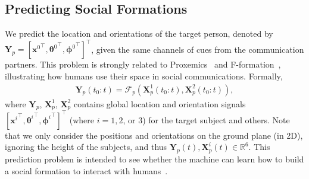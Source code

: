 

\subsection{Predicting Social Formations}
We predict the location and orientations of the target person, denoted by $\mathbf{Y}_p = [{\mathbf{x}^0}^{\top}, {\boldsymbol{\theta}^{0}}^{\top}, {\boldsymbol{\phi}^{0}}^{\top} ]^{\top}$, given the same channels of cues from the communication partners. This problem is strongly related to Proxemics~\cite{Hall66} and F-formation~\cite{kendon90}, illustrating how humans use their space in social communications. Formally, 
\begin{gather}	
 \mathbf{Y}_p (t_0:t) = \mathcal{F}_p \left( \mathbf{X}_p^1(t_0:t), \mathbf{X}_p^2(t_0:t) \right),
 \label{eq:pred_formation}
\end{gather}
where $\mathbf{Y}_p$, $\mathbf{X}_p^1$, $\mathbf{X}_p^2$ contains global location and orientation signals $[{\mathbf{x}^i}^{\top}, {\boldsymbol{\theta}^{i}}^{\top}, {\boldsymbol{\phi}^{i}}^{\top} ]^{\top}$ (where $i=1,2$, or $3$) for the target subject and others.
Note that we only consider the positions and orientations on the ground plane (in 2D), ignoring the height of the subjects, and thus $\mathbf{Y}_p(t), \mathbf{X}_p^i(t) \in \mathbb{R}^6$. This prediction problem is intended to see whether the machine can learn how to build a social formation to interact with humans~\cite{vazquez2017towards}.


